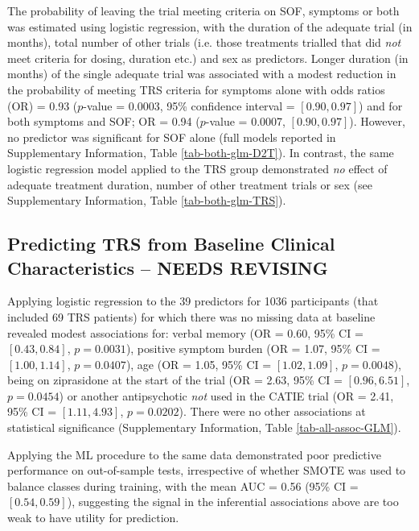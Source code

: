 \documentclass[a4paper,nobib]{article}
\begin{document}
The probability of leaving the trial meeting criteria on SOF, symptoms or both was estimated using logistic regression, with the duration of the adequate trial (in months), total number of other trials (i.e. those treatments trialled that did \emph{not} meet criteria for dosing, duration etc.) and sex as predictors.  Longer duration (in months) of the single adequate trial was associated with a modest reduction in the probability of meeting TRS criteria for symptoms alone with odds ratios (OR) = 0.93 ($p$-value = 0.0003, 95\% confidence interval = $[0.90, 0.97]$) and for both symptoms and SOF; OR = 0.94 ($p$-value = 0.0007, $[0.90,0.97]$).  However, no predictor was significant for SOF alone (full models reported in Supplementary Information, Table \ref{tab-both-glm-D2T}). In contrast, the same logistic regression model applied to the TRS group demonstrated \emph{no} effect of adequate treatment duration, number of other treatment trials or sex (see Supplementary Information, Table \ref{tab-both-glm-TRS}).

\subsection*{Predicting TRS from Baseline Clinical Characteristics -- NEEDS REVISING}
Applying logistic regression to the 39 predictors for 1036 participants (that included 69 TRS patients) for which there was no missing data at baseline revealed modest associations for: verbal memory (OR = 0.60, 95\% CI = $[0.43, 0.84]$, $p = 0.0031$), positive symptom burden (OR = 1.07, 95\% CI = $[1.00, 1.14]$, $p = 0.0407$), age (OR = 1.05, 95\% CI = $[1.02, 1.09]$, $p=0.0048$), being on ziprasidone at the start of the trial (OR = 2.63, 95\% CI = $[0.96, 6.51]$, $p = 0.0454$) or another antipsychotic \emph{not} used in the CATIE trial (OR = 2.41, 95\% CI = $[1.11, 4.93]$, $p = 0.0202$).  There were no other associations at statistical significance (Supplementary Information, Table \ref{tab-all-assoc-GLM}).

Applying the ML procedure to the same data demonstrated poor predictive performance on out-of-sample tests, irrespective of whether SMOTE was used to balance classes during training, with the mean AUC = 0.56 (95\% CI = $[0.54, 0.59]$), suggesting the signal in the inferential associations above are too weak to have utility for prediction. 
\end{document}
